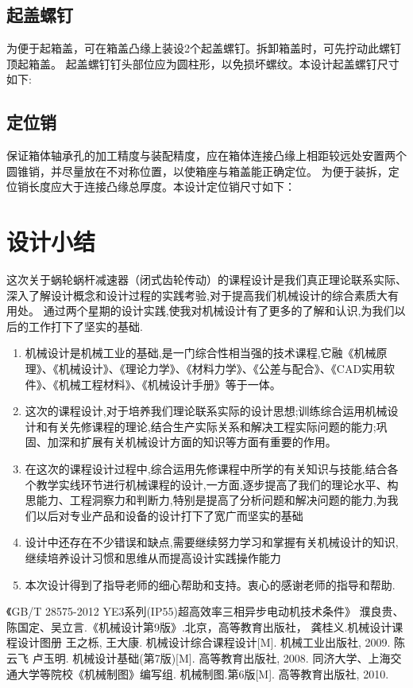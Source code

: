 \documentclass[UTF8,11pt,a4paper,oneside,final,zihao=-4,]{ctexrep}%
\begin{document}
	
	\section{起盖螺钉}
	{为便于起箱盖，可在箱盖凸缘上装设2个起盖螺钉。拆卸箱盖时，可先拧动此螺钉顶起箱盖。
		起盖螺钉钉头部位应为圆柱形，以免损坏螺纹。本设计起盖螺钉尺寸如下:}
	
	\section{定位销}
	{保证箱体轴承孔的加工精度与装配精度，应在箱体连接凸缘上相距较远处安置两个圆锥销，并尽量放在不对称位置，以使箱座与箱盖能正确定位。
		为便于装拆，定位销长度应大于连接凸缘总厚度。本设计定位销尺寸如下：
	}
	\newpage
	\chapter*{设计小结}
	这次关于蜗轮蜗杆减速器（闭式齿轮传动）的课程设计是我们真正理论联系实际、深入了解设计概念和设计过程的实践考验,对于提高我们机械设计的综合素质大有用处。
	通过两个星期的设计实践,使我对机械设计有了更多的了解和认识,为我们以后的工作打下了坚实的基础.
	\begin{enumerate}
		\item 机械设计是机械工业的基础,是一门综合性相当强的技术课程,它融《机械原理》、《机械设计》、《理论力学》、《材料力学》、《公差与配合》、《CAD实用软件》、《机械工程材料》、《机械设计手册》等于一体。
		\item 这次的课程设计,对于培养我们理论联系实际的设计思想;训练综合运用机械设计和有关先修课程的理论,结合生产实际关系和解决工程实际问题的能力;巩固、加深和扩展有关机械设计方面的知识等方面有重要的作用。
		\item 在这次的课程设计过程中,综合运用先修课程中所学的有关知识与技能,结合各个教学实线环节进行机械课程的设计,一方面,逐步提高了我们的理论水平、构思能力、工程洞察力和判断力,特别是提高了分析问题和解决问题的能力,为我们以后对专业产品和设备的设计打下了宽广而坚实的基础
		\item 设计中还存在不少错误和缺点,需要继续努力学习和掌握有关机械设计的知识,继续培养设计习惯和思维从而提高设计实践操作能力
		
		\item 本次设计得到了指导老师的细心帮助和支持。衷心的感谢老师的指导和帮助.
		 
	\end{enumerate}
	\begin{thebibliography}{66}
		
		  《GB/T 28575-2012 YE3系列(IP55)超高效率三相异步电动机技术条件》
		 濮良贵、陈国定、吴立言.《机械设计第9版》.北京，高等教育出版社，
		龚桂义.机械设计课程设计图册
		王之栎, 王大康. 机械设计综合课程设计[M]. 机械工业出版社, 2009.
		陈云飞 卢玉明. 机械设计基础(第7版)[M]. 高等教育出版社, 2008.
		同济大学、上海交通大学等院校《机械制图》编写组. 机械制图.第6版[M]. 高等教育出版社, 2010.
		
		
	\end{thebibliography}
\end{document}
